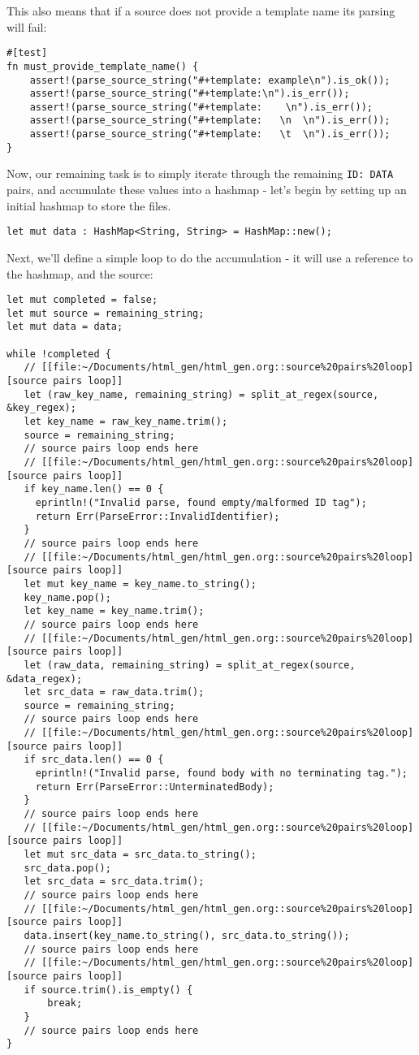 \documentclass[11pt]{article}
\begin{document}
This also means that if a source does not provide a template name its parsing will fail:
\begin{verbatim}
#[test]
fn must_provide_template_name() {
    assert!(parse_source_string("#+template: example\n").is_ok());
    assert!(parse_source_string("#+template:\n").is_err());
    assert!(parse_source_string("#+template:    \n").is_err());
    assert!(parse_source_string("#+template:   \n  \n").is_err());
    assert!(parse_source_string("#+template:   \t  \n").is_err());
}
\end{verbatim}


Now, our remaining task is to simply iterate through the remaining \texttt{ID: DATA} pairs, and accumulate these values into a hashmap - let's begin
by setting up an initial hashmap to store the files.
\begin{verbatim}
let mut data : HashMap<String, String> = HashMap::new();
\end{verbatim}
Next, we'll define a simple loop to do the accumulation - it will use a reference to the hashmap, and the source:
\begin{verbatim}
let mut completed = false;
let mut source = remaining_string;
let mut data = data;

while !completed {
   // [[file:~/Documents/html_gen/html_gen.org::source%20pairs%20loop][source pairs loop]]
   let (raw_key_name, remaining_string) = split_at_regex(source, &key_regex);
   let key_name = raw_key_name.trim();
   source = remaining_string;
   // source pairs loop ends here
   // [[file:~/Documents/html_gen/html_gen.org::source%20pairs%20loop][source pairs loop]]
   if key_name.len() == 0 {
     eprintln!("Invalid parse, found empty/malformed ID tag");
     return Err(ParseError::InvalidIdentifier);
   }
   // source pairs loop ends here
   // [[file:~/Documents/html_gen/html_gen.org::source%20pairs%20loop][source pairs loop]]
   let mut key_name = key_name.to_string();
   key_name.pop();
   let key_name = key_name.trim();
   // source pairs loop ends here
   // [[file:~/Documents/html_gen/html_gen.org::source%20pairs%20loop][source pairs loop]]
   let (raw_data, remaining_string) = split_at_regex(source, &data_regex);
   let src_data = raw_data.trim();
   source = remaining_string;
   // source pairs loop ends here
   // [[file:~/Documents/html_gen/html_gen.org::source%20pairs%20loop][source pairs loop]]
   if src_data.len() == 0 {
     eprintln!("Invalid parse, found body with no terminating tag.");
     return Err(ParseError::UnterminatedBody);
   }
   // source pairs loop ends here
   // [[file:~/Documents/html_gen/html_gen.org::source%20pairs%20loop][source pairs loop]]
   let mut src_data = src_data.to_string();
   src_data.pop();
   let src_data = src_data.trim();
   // source pairs loop ends here
   // [[file:~/Documents/html_gen/html_gen.org::source%20pairs%20loop][source pairs loop]]
   data.insert(key_name.to_string(), src_data.to_string());
   // source pairs loop ends here
   // [[file:~/Documents/html_gen/html_gen.org::source%20pairs%20loop][source pairs loop]]
   if source.trim().is_empty() {
       break;
   }
   // source pairs loop ends here
}
\end{verbatim}
\end{document}
